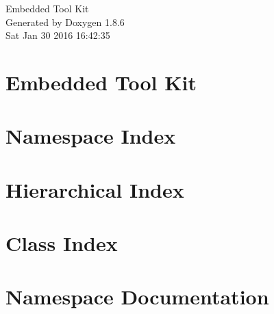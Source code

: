 \documentclass[twoside]{book}
\newcommand{\clearemptydoublepage}{%
  \newpage{\pagestyle{empty}\cleardoublepage}%
}
\begin{document}
\hypersetup{pageanchor=false}
\begin{titlepage}
\vspace*{7cm}
\begin{center}%
{\Large Embedded Tool Kit }\\
\vspace*{1cm}
{\large Generated by Doxygen 1.8.6}\\
\vspace*{0.5cm}
{\small Sat Jan 30 2016 16:42:35}\\
\end{center}
\end{titlepage}
\clearemptydoublepage
\tableofcontents
\clearemptydoublepage
{}
\hypersetup{pageanchor=true}

\chapter{Embedded Tool Kit}
\label{index}\hypertarget{index}{}
\chapter{Namespace Index}

\chapter{Hierarchical Index}

\chapter{Class Index}

\chapter{Namespace Documentation}

\end{document}
